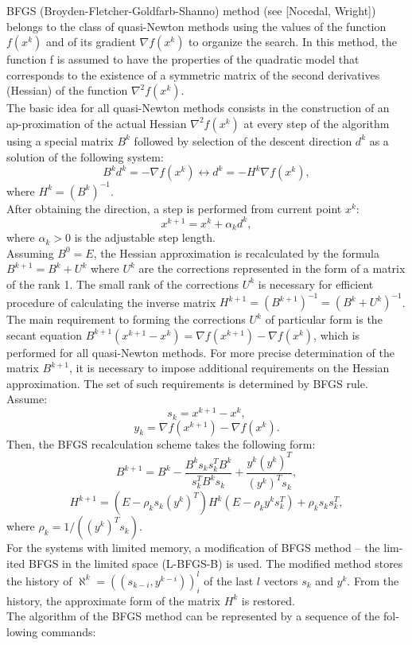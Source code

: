 \documentclass[runningheads]{llncs}
\begin{document}
BFGS (Broyden-Fletcher-Goldfarb-Shanno) method (see [Nocedal, Wright]) belongs to the class of quasi-Newton methods using the values of the function $f(x^k)$ and of its gradient $\nabla f(x^k)$ to organize the search. In this method, the function f is assumed to have the properties of the quadratic model that corresponds to the existence of a symmetric matrix of the second derivatives (Hessian) of the function $\nabla^2 f(x^k)$.\\
The basic idea for all quasi-Newton methods consists in the construction of an ap-proximation of the actual Hessian $\nabla^2 f(x^k)$ at every step of the algorithm using a special matrix $B^k$ followed by selection of the descent direction $d^k$ as a solution of the following system:
$$ B^k d^k = -\nabla f(x^k) \leftrightarrow d^k = -H^k \nabla f(x^k),$$
where $H^k={(B^k)}^{-1}$.\\
After obtaining the direction, a step is performed from current point $x^k$:
$$ x^{k+1}=x^k+ \alpha_k d^k,$$
where $\alpha_k>0$ is the adjustable step length.\\
Assuming $B^0=E$, the Hessian approximation is recalculated by the formula $B^{k+1}= B^k+ U^k$ where $U^k$ are the corrections represented in the form of a matrix of the rank 1. The small rank of the corrections $U^k$ is necessary for efficient procedure of calculating the inverse matrix $H^{k+1}=(B^{k+1})^{-1}=(B^k+ U^k)^{-1}$.\\
The main requirement to forming the corrections $U^k$ of particular form is the secant equation $B^{k+1} (x^{k+1} - x^k )= \nabla f(x^{k+1})- \nabla f(x^k)$, which is performed for all quasi-Newton methods. For more precise determination of the matrix $B^{k+1}$, it is necessary to impose additional requirements on the Hessian approximation. The set of such requirements is determined by BFGS rule. Assume:
$$ s_k = x^{k+1} - x^k,$$
$$ y_k = \nabla f(x^{k+1})- \nabla f(x^k).$$
Then, the BFGS recalculation scheme takes the following form:
$$ B^{k+1} = B^k - \frac{B^k s_k s_k^T B^k}{s_k^T B^k s_k} + \frac{y^k (y^k)^{T}}{(y^k)^{T} s_k},$$
$$ H^{k+1} = (E - \rho_k s_k (y^k)^{T}) H^k (E - \rho_k y^k s_k^T) + \rho_k s_k s_k^T,$$
where $\rho_k = 1/((y^k)^{T} s_k)$.\\
For the systems with limited memory, a modification of BFGS method – the lim-ited BFGS in the limited space (L-BFGS-B) is used. The modified method stores the history of $\aleph^k = ((s_{k-i}, y^{k-i}))_i^l$ of the last $l$ vectors $s_k$ and $y^k$. From the history, the approximate form of the matrix $H^k$ is restored.\\
The algorithm of the BFGS method can be represented by a sequence of the fol-lowing commands:
\end{document}
